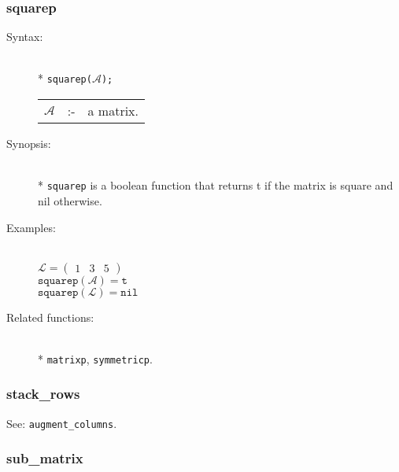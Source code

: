 \subsubsection{squarep}
\label{linalg:squarep}

\begin{description}
\item[Syntax:]\mbox{}\\*
\texttt{squarep($\mathcal{A}$);}\\[2mm]
\begin{tabular}{l l l}
$\mathcal{A}$ &:-& a matrix.
\end{tabular}

\item[Synopsis:]\mbox{}\\*
\texttt{squarep} is a boolean function that returns t if
                the matrix is square and nil otherwise.

\item[Examples:]\mbox{}\\
  \(\mathcal{L} = \begin{pmatrix} 1 & 3 & 5 \end{pmatrix}\) \\[2mm]
  \(\texttt{squarep}(\mathcal{A}) = \texttt{t}\) \\[2mm]
  \(\texttt{squarep}(\mathcal{L}) = \texttt{nil}\)

\item[Related functions:]\mbox{}\\*
\texttt{matrixp}, \texttt{symmetricp}.
\end{description}


\subsubsection{stack\_rows}
\label{linalg:stack_rows}

See: \texttt{augment\_columns}.


\subsubsection{sub\_matrix}
\label{linalg:sub_matrix}

